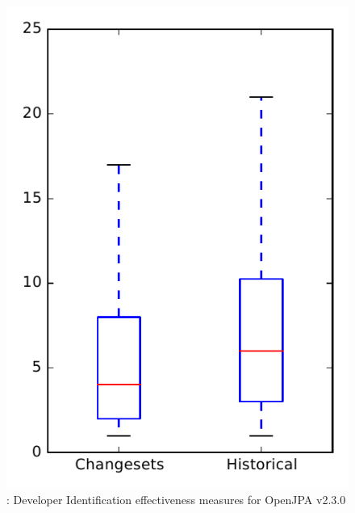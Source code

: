 
\begin{figure}
\centering
\includegraphics[height=0.4\textheight]{figures/dit/rq2_openjpa_no_outlier}
\caption{\dtwo: Developer Identification effectiveness measures for OpenJPA v2.3.0}
\label{fig:dit:rq2:openjpa}
\end{figure}
